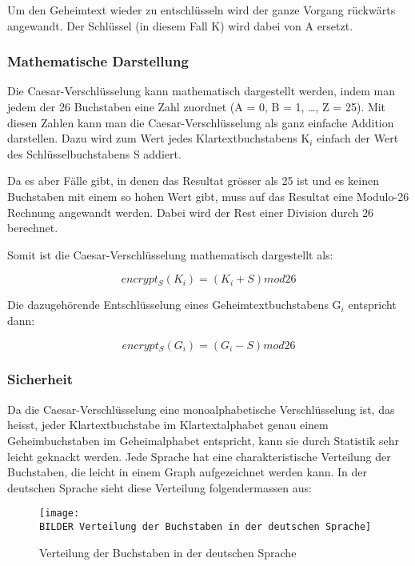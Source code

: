 Um den Geheimtext wieder zu entschlüsseln wird der ganze Vorgang rückwärts angewandt. Der Schlüssel (in diesem Fall K) wird dabei von A ersetzt.

\subsubsection{Mathematische Darstellung}
\label{sec:c-mathematische-darstellung}
Die Caesar-Verschlüsselung kann mathematisch dargestellt werden, indem man jedem der 26 Buchstaben eine Zahl zuordnet (A = 0, B = 1, \ldots, Z = 25). Mit diesen Zahlen kann man die Caesar-Verschlüsselung als ganz einfache Addition darstellen. Dazu wird zum Wert jedes Klartextbuchstabens K$_i$ einfach der Wert des Schlüsselbuchstabens S addiert.

Da es aber Fälle gibt, in denen das Resultat grösser als 25 ist und es keinen Buchstaben mit einem so hohen Wert gibt, muss auf das Resultat eine Modulo-26 Rechnung angewandt werden. Dabei wird der Rest einer Division durch 26 berechnet.

Somit ist die Caesar-Verschlüsselung mathematisch dargestellt als:

\begin{equation}
encrypt_{S}(K_{i})=(K_{i}+S) mod 26
\end{equation}

Die dazugehörende Entschlüsselung eines Geheimtextbuchstabens G$_i$ entspricht dann:

\begin{equation}
encrypt_{S}(G_{i})=(G_{i}-S) mod 26
\end{equation}


\subsubsection{Sicherheit}
\label{sec:c-sicherheit}
Da die Caesar-Verschlüsselung eine monoalphabetische Verschlüsselung ist, das heisst, jeder Klartextbuchstabe im Klartextalphabet genau einem Geheimbuchstaben im Geheimalphabet entspricht, kann sie durch Statistik sehr leicht geknackt werden. Jede Sprache hat eine charakteristische Verteilung der Buchstaben, die leicht in einem Graph aufgezeichnet werden kann. In der deutschen Sprache sieht diese Verteilung folgendermassen aus:

\begin{figure}[h!]  %
	\centering
		\texttt{[image: \\BILDER Verteilung der Buchstaben in der deutschen Sprache]}
 	\caption{Verteilung der Buchstaben in der deutschen Sprache \cite{wikipedia:caesar_verschluesselung}}
  \label{fig:verteilung-buchstaben-de}
\end{figure}


